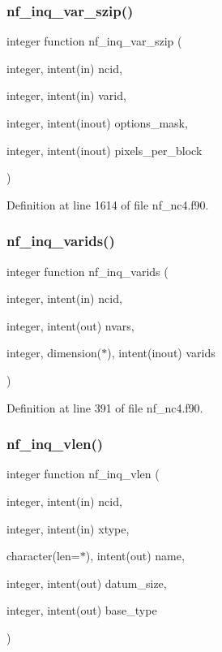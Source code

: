 \subsubsection{\texorpdfstring{nf\+\_\+inq\+\_\+var\+\_\+szip()}{nf\_inq\_var\_szip()}}
{\footnotesize\ttfamily integer function nf\+\_\+inq\+\_\+var\+\_\+szip (\begin{DoxyParamCaption}\item[{integer, intent(in)}]{ncid,  }\item[{integer, intent(in)}]{varid,  }\item[{integer, intent(inout)}]{options\+\_\+mask,  }\item[{integer, intent(inout)}]{pixels\+\_\+per\+\_\+block }\end{DoxyParamCaption})}



Definition at line 1614 of file nf\+\_\+nc4.\+f90.

\mbox{\label{nf__nc4_8f90_a04f0d3dae060df0db05ae09847afc3bb}} 
\subsubsection{\texorpdfstring{nf\+\_\+inq\+\_\+varids()}{nf\_inq\_varids()}}
{\footnotesize\ttfamily integer function nf\+\_\+inq\+\_\+varids (\begin{DoxyParamCaption}\item[{integer, intent(in)}]{ncid,  }\item[{integer, intent(out)}]{nvars,  }\item[{integer, dimension($\ast$), intent(inout)}]{varids }\end{DoxyParamCaption})}



Definition at line 391 of file nf\+\_\+nc4.\+f90.

\mbox{\label{nf__nc4_8f90_aff32bcfd6e5c1c39712b15df69d3e87c}} 
\subsubsection{\texorpdfstring{nf\+\_\+inq\+\_\+vlen()}{nf\_inq\_vlen()}}
{\footnotesize\ttfamily integer function nf\+\_\+inq\+\_\+vlen (\begin{DoxyParamCaption}\item[{integer, intent(in)}]{ncid,  }\item[{integer, intent(in)}]{xtype,  }\item[{character(len=$\ast$), intent(out)}]{name,  }\item[{integer, intent(out)}]{datum\+\_\+size,  }\item[{integer, intent(out)}]{base\+\_\+type }\end{DoxyParamCaption})}



